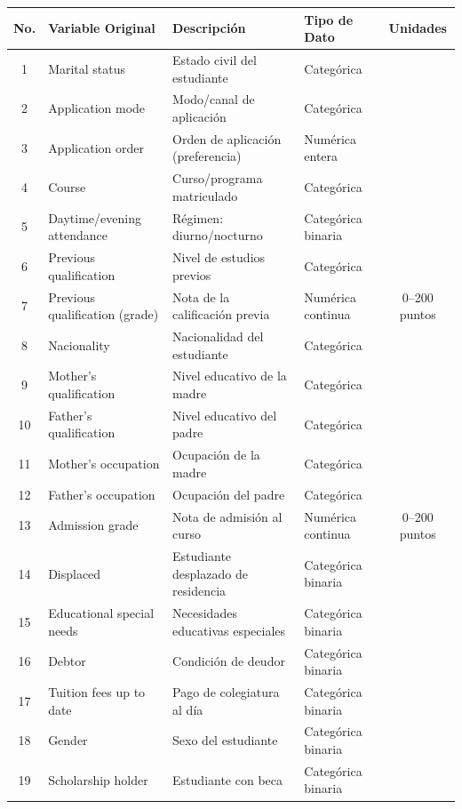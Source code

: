 \documentclass[10pt]{article}
\begin{document}
\begin{table}[H]
\centering
\small
\begin{tabular}{|c|p{5cm}|p{6.2cm}|p{3.2cm}|c|}
\hline
\textbf{No.} & \textbf{Variable Original} & \textbf{Descripción} & \textbf{Tipo de Dato} & \textbf{Unidades} \\ \hline
1 & Marital status & Estado civil del estudiante & Categórica &  \\ \hline
2 & Application mode & Modo/canal de aplicación & Categórica &  \\ \hline
3 & Application order & Orden de aplicación (preferencia) & Numérica entera &  \\ \hline
4 & Course & Curso/programa matriculado & Categórica &  \\ \hline
5 & Daytime/evening attendance & Régimen: diurno/nocturno & Categórica binaria &  \\ \hline
6 & Previous qualification & Nivel de estudios previos & Categórica &  \\ \hline
7 & Previous qualification (grade) & Nota de la calificación previa & Numérica continua & 0–200 puntos \\ \hline
8 & Nacionality & Nacionalidad del estudiante & Categórica &  \\ \hline
9 & Mother's qualification & Nivel educativo de la madre & Categórica &  \\ \hline
10 & Father's qualification & Nivel educativo del padre & Categórica &  \\ \hline
11 & Mother's occupation & Ocupación de la madre & Categórica &  \\ \hline
12 & Father's occupation & Ocupación del padre & Categórica &  \\ \hline
13 & Admission grade & Nota de admisión al curso & Numérica continua & 0–200 puntos \\ \hline
14 & Displaced & Estudiante desplazado de residencia & Categórica binaria &  \\ \hline
15 & Educational special needs & Necesidades educativas especiales & Categórica binaria &  \\ \hline
16 & Debtor & Condición de deudor & Categórica binaria &  \\ \hline
17 & Tuition fees up to date & Pago de colegiatura al día & Categórica binaria &  \\ \hline
18 & Gender & Sexo del estudiante & Categórica binaria &  \\ \hline
19 & Scholarship holder & Estudiante con beca & Categórica binaria &  \\ \hline

\end{tabular}
\end{table}
\end{document}
